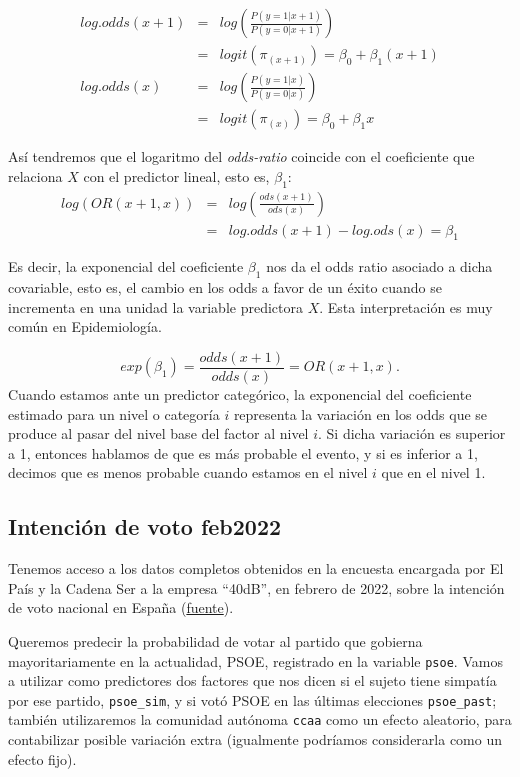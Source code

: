\documentclass[
]{book}
\begin{document}
\begin{eqnarray*}
log.odds(x+1)&=&log \left( \frac{P(y=1|x+1)}{P(y=0|x+1)} \right)\\
 &=&logit(\pi_{(x+1)}) =\beta_0+\beta_1 (x+1) \\
log.odds(x) &=& log \left(\frac{P(y=1|x)}{P(y=0|x)} \right)\\
&=&logit(\pi_{(x)})=\beta_0+\beta_1 x
\end{eqnarray*}

Así tendremos que el logaritmo del \emph{odds-ratio} coincide con el
coeficiente que relaciona \(X\) con el predictor lineal, esto es,
\(\beta_1\):\\
\begin{eqnarray*}
log(OR(x+1,x)) &=& log \left(\frac{ods (x+1)}{ods(x)} \right) \\
&=& log.odds(x+1)-log.ods(x)= \beta_1
\end{eqnarray*}

Es decir, la exponencial del coeficiente \(\beta_1\) nos da el odds ratio
asociado a dicha covariable, esto es, el cambio en los odds a favor de
un éxito cuando se incrementa en una unidad la variable predictora \(X\).
Esta interpretación es muy común en Epidemiología.

\[exp(\beta_1)=\frac{odds(x+1)}{odds(x)}=OR(x+1,x).\]
Cuando estamos ante un predictor categórico, la exponencial del coeficiente estimado para un nivel o categoría \(i\) representa la variación en los odds que se produce al pasar del nivel base del factor al nivel \(i\). Si dicha variación es superior a 1, entonces hablamos de que es más probable el evento, y si es inferior a 1, decimos que es menos probable cuando estamos en el nivel \(i\) que en el nivel 1.

\hypertarget{intenciuxf3n-de-voto-feb2022}{%
\subsection{Intención de voto feb2022}\label{intenciuxf3n-de-voto-feb2022}}

Tenemos acceso a los datos completos obtenidos en la encuesta encargada
por El País y la Cadena Ser a la empresa ``40dB'', en febrero de 2022,
sobre la intención de voto nacional en España
(\href{https://elpais.com/espana/2022-02-07/consulte-todos-los-datos-internos-de-la-encuesta-de-el-pais-cuestionarios-cruces-y-respuestas-individuales.html}{fuente}).

Queremos predecir la probabilidad de votar al partido que gobierna
mayoritariamente en la actualidad, PSOE, registrado en la variable
\texttt{psoe}. Vamos a utilizar como predictores dos factores que nos dicen si
el sujeto tiene simpatía por ese partido, \texttt{psoe\_sim}, y si votó PSOE en
las últimas elecciones \texttt{psoe\_past}; también utilizaremos la comunidad
autónoma \texttt{ccaa} como un efecto aleatorio, para contabilizar posible
variación extra (igualmente podríamos considerarla como un efecto fijo).
\end{document}
